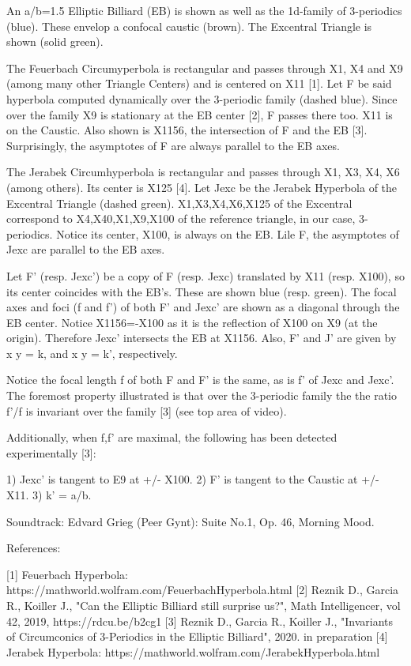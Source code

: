 An a/b=1.5 Elliptic Billiard (EB) is shown as well as the 1d-family of 3-periodics (blue). These envelop a confocal caustic (brown). The Excentral Triangle is shown (solid green).

The Feuerbach Circumyperbola is rectangular and passes through X1, X4 and X9 (among many other Triangle Centers) and is centered on X11 [1]. Let F be said hyperbola computed dynamically over the 3-periodic family (dashed blue).  Since over the family X9 is stationary at the EB center [2],  F passes there too. X11 is on the Caustic. Also shown is X1156, the intersection of F and the EB [3]. Surprisingly, the asymptotes of F are always parallel to the EB axes.

The Jerabek Circumhyperbola is rectangular and passes through X1, X3, X4, X6 (among others). Its center is X125 [4]. Let Jexc be the Jerabek Hyperbola of the Excentral Triangle (dashed green). X1,X3,X4,X6,X125 of the Excentral correspond to X4,X40,X1,X9,X100 of the reference triangle, in our case, 3-periodics. Notice its center, X100, is always on the EB. Lile F, the asymptotes of Jexc are parallel to the EB axes.

Let F' (resp. Jexc') be a copy of F (resp. Jexc) translated by X11 (resp. X100), so its center coincides with the EB's. These are shown blue (resp. green). The focal axes and foci (f and f') of both F' and Jexc' are shown as a diagonal through the EB center. Notice X1156=-X100 as it is the reflection of X100 on X9 (at the origin). Therefore Jexc' intersects the EB at X1156. Also, F' and J' are given by x y = k, and x y = k', respectively.

Notice the focal length f of both F and F' is the same, as is f' of Jexc and Jexc'. The foremost property illustrated is that over the 3-periodic family the the ratio f'/f is invariant over the family [3] (see top area of video).

Additionally, when f,f' are maximal, the following has been detected experimentally [3]:

1) Jexc' is tangent to E9 at +/- X100.
2) F' is tangent to the Caustic at +/- X11.
3) k' = a/b.

Soundtrack: Edvard Grieg (Peer Gynt): Suite No.1, Op. 46, Morning Mood.

References:

[1] Feuerbach Hyperbola: https://mathworld.wolfram.com/FeuerbachHyperbola.html
[2] Reznik D., Garcia R., Koiller J., "Can the Elliptic Billiard still surprise us?", Math Intelligencer, vol 42, 2019, https://rdcu.be/b2cg1
[3] Reznik D., Garcia R., Koiller J., "Invariants of Circumconics of 3-Periodics in the Elliptic Billiard", 2020. in preparation
[4] Jerabek Hyperbola: https://mathworld.wolfram.com/JerabekHyperbola.html